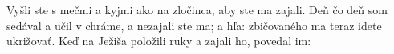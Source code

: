 Vyšli ste s mečmi a kyjmi ako na zločinca, aby ste ma zajali.
\versseparator
Deň čo deň som sedával a učil v chráme, a nezajali ste ma; a hľa: zbičovaného ma teraz idete ukrižovať.
\versseparator
Keď na Ježiša položili ruky a zajali ho, povedal im:

